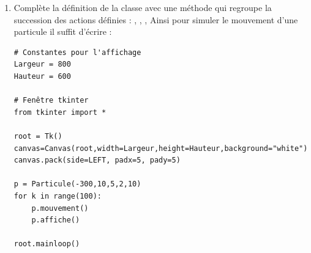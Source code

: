 \documentclass[11pt,class=report,crop=false]{standalone}
\begin{document}
\begin{activite}
\begin{enumerate}
   
  \item Complète la définition de la classe avec une méthode  qui regroupe la succession des actions définies : , , ,  Ainsi pour simuler le mouvement d'une particule il suffit d'écrire : 
  
\begin{lstlisting}
# Constantes pour l'affichage
Largeur = 800
Hauteur = 600

# Fenêtre tkinter
from tkinter import *

root = Tk()      
canvas=Canvas(root,width=Largeur,height=Hauteur,background="white")
canvas.pack(side=LEFT, padx=5, pady=5)

p = Particule(-300,10,5,2,10)
for k in range(100):
    p.mouvement()
    p.affiche()
    
root.mainloop()
\end{lstlisting} 

\end{enumerate} 

\end{activite}




\end{document}
